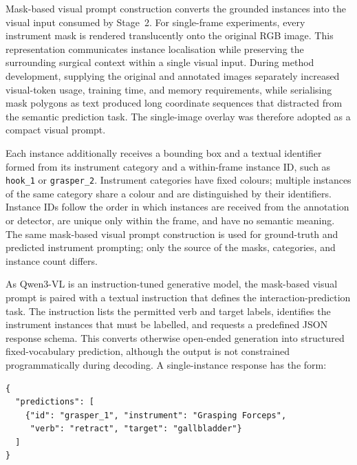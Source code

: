 Mask-based visual prompt construction converts the grounded instances into the visual input consumed by Stage~2. For single-frame experiments, every instrument mask is rendered translucently onto the original RGB image. This representation communicates instance localisation while preserving the surrounding surgical context within a single visual input. During method development, supplying the original and annotated images separately increased visual-token usage, training time, and memory requirements, while serialising mask polygons as text produced long coordinate sequences that distracted from the semantic prediction task. The single-image overlay was therefore adopted as a compact visual prompt.

Each instance additionally receives a bounding box and a textual identifier formed from its instrument category and a within-frame instance ID, such as \texttt{hook\_1} or \texttt{grasper\_2}. Instrument categories have fixed colours; multiple instances of the same category share a colour and are distinguished by their identifiers. Instance IDs follow the order in which instances are received from the annotation or detector, are unique only within the frame, and have no semantic meaning. The same mask-based visual prompt construction is used for ground-truth and predicted instrument prompting; only the source of the masks, categories, and instance count differs.

As Qwen3-VL is an instruction-tuned generative model, the mask-based visual prompt is paired with a textual instruction that defines the interaction-prediction task. The instruction lists the permitted verb and target labels, identifies the instrument instances that must be labelled, and requests a predefined JSON response schema. This converts otherwise open-ended generation into structured fixed-vocabulary prediction, although the output is not constrained programmatically during decoding. A single-instance response has the form:

\begin{lstlisting}[style=c5prompt]
{
  "predictions": [
    {"id": "grasper_1", "instrument": "Grasping Forceps",
     "verb": "retract", "target": "gallbladder"}
  ]
}
\end{lstlisting}


